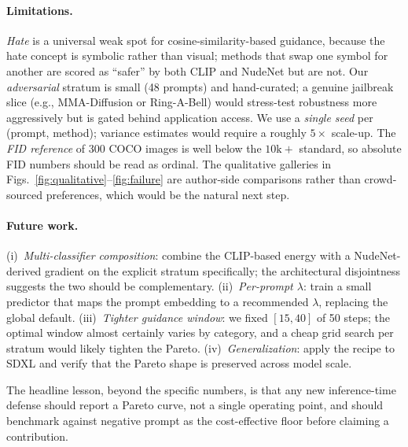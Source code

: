 \documentclass{article}
\begin{document}
\paragraph{Limitations.} \emph{Hate} is a universal weak spot for cosine-similarity-based guidance, because the hate concept is symbolic rather than visual; methods that swap one symbol for another are scored as ``safer'' by both CLIP and NudeNet but are not. Our \emph{adversarial} stratum is small (48 prompts) and hand-curated; a genuine jailbreak slice (e.g., MMA-Diffusion or Ring-A-Bell) would stress-test robustness more aggressively but is gated behind application access. We use a \emph{single seed} per (prompt, method); variance estimates would require a roughly $5\times$ scale-up. The \emph{FID reference} of 300 COCO images is well below the $10\text{k}+$ standard, so absolute FID numbers should be read as ordinal. The qualitative galleries in Figs.~\ref{fig:qualitative}--\ref{fig:failure} are author-side comparisons rather than crowd-sourced preferences, which would be the natural next step.

\paragraph{Future work.} (i)~\emph{Multi-classifier composition}: combine the CLIP-based energy with a NudeNet-derived gradient on the explicit stratum specifically; the architectural disjointness suggests the two should be complementary. (ii)~\emph{Per-prompt $\lambda$}: train a small predictor that maps the prompt embedding to a recommended $\lambda$, replacing the global default. (iii)~\emph{Tighter guidance window}: we fixed $[15, 40]$ of 50 steps; the optimal window almost certainly varies by category, and a cheap grid search per stratum would likely tighten the Pareto. (iv)~\emph{Generalization}: apply the recipe to SDXL and verify that the Pareto shape is preserved across model scale.

The headline lesson, beyond the specific numbers, is that any new inference-time defense should report a Pareto curve, not a single operating point, and should benchmark against negative prompt as the cost-effective floor before claiming a contribution.

\FloatBarrier



\end{document}
